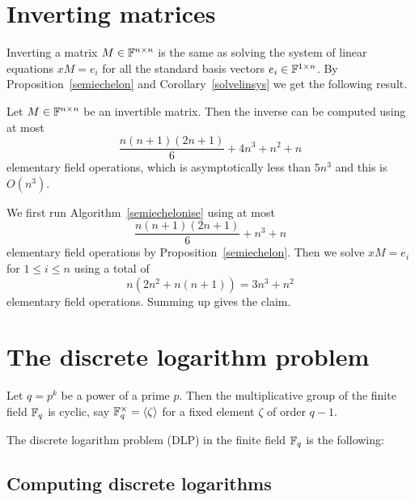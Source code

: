 \section{Inverting matrices}
\label{sec:invert}
%

Inverting a matrix $M \in \mathbb{F}^{n \times n}$ is the same as solving the
system of linear equations $xM = e_i$ for all the standard basis
vectors $e_i \in \mathbb{F}^{1 \times n}$. By Proposition~\ref{semiechelon}
and Corollary~\ref{solvelinsys} we get the following result.

\begin{Prop}
%
Let $M \in \mathbb{F}^{n \times n}$ be an invertible matrix. Then the inverse
can be computed using at most
\[ \frac{n(n+1)(2n+1)}{6} + 4n^3 + n^2 + n \]
elementary field operations, which is asymptotically less than $5n^3$
and this is $O(n^3)$.
\end{Prop}
\proofbeg
We first run Algorithm~\ref{semiechelonise} using at most
\[ \frac{n(n+1)(2n+1)}{6} + n^3 + n \]
elementary field operations by Proposition~\ref{semiechelon}. Then
we solve $xM = e_i$ for $1 \le i \le n$ using a total of
\[ n(2n^2+n(n+1)) = 3n^3+n^2 \]
elementary field operations. Summing up gives the claim.
\proofend

\section{The discrete logarithm problem}
\label{thedlp}
%

\begin{Problem}
%
    Let $q = p^k$ be a power of a prime $p$. Then the multiplicative
    group of the finite field $\mathbb{F}_q$ is cyclic, say $\mathbb{F}_q^\times =
    \left< \zeta \right>$ for a fixed element $\zeta$ of order $q-1$.

    The discrete logarithm problem (DLP) in the finite field $\mathbb{F}_q$ is
    the following:

    \begin{center}
\end{center}
\end{Problem}

\subsection*{Computing discrete logarithms}
%

